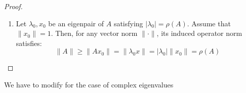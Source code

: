 \documentclass[../main/main.tex]{subfiles}
\begin{document}
\begin{proof}
  \begin{enumerate}
    \item Let $\lambda_{0},x_{0}$ be an eigenpair of $A$ satisfying $|\lambda_{0}| = \rho(A)$. Assume that $\|x_0\|=1$. Then, for any vector norm $\|\cdot\|$, its induced operator norm satisfies: \[
          \|A\|\geq \|Ax_{0}\| = \|\lambda_{0}x\| = |\lambda_{0}| \|x_{0}\| = \rho(A)
          \]
  \end{enumerate}

\end{proof}
\begin{remark}
We have to modify for the case of complex eigenvalues
\end{remark}
\end{document}

